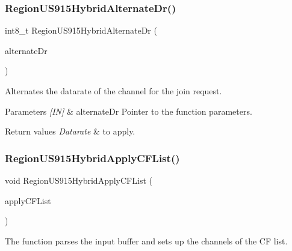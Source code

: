 \subsubsection{\texorpdfstring{Region\+U\+S915\+Hybrid\+Alternate\+Dr()}{RegionUS915HybridAlternateDr()}}
{\footnotesize\ttfamily int8\+\_\+t Region\+U\+S915\+Hybrid\+Alternate\+Dr (\begin{DoxyParamCaption}\item[{\hyperlink{group__REGION_ga001ea4338d1c83f4c785b49d7ad2d696}{Alternate\+Dr\+Params\+\_\+t} $\ast$}]{alternate\+Dr }\end{DoxyParamCaption})}



Alternates the datarate of the channel for the join request. 


\begin{DoxyParams}{Parameters}
{\em \mbox{[}\+I\+N\mbox{]}} & alternate\+Dr Pointer to the function parameters.\\
\hline
\end{DoxyParams}

\begin{DoxyRetVals}{Return values}
{\em Datarate} & to apply. \\
\hline
\end{DoxyRetVals}
\mbox{\label{group__REGIONUS915HYB_gadf2edbcb9c0e296e8de9fe4a40fc96ee}} 
\subsubsection{\texorpdfstring{Region\+U\+S915\+Hybrid\+Apply\+C\+F\+List()}{RegionUS915HybridApplyCFList()}}
{\footnotesize\ttfamily void Region\+U\+S915\+Hybrid\+Apply\+C\+F\+List (\begin{DoxyParamCaption}\item[{\hyperlink{group__REGION_ga71588e9ad07e34b78fa91d51881fd3c6}{Apply\+C\+F\+List\+Params\+\_\+t} $\ast$}]{apply\+C\+F\+List }\end{DoxyParamCaption})}



The function parses the input buffer and sets up the channels of the CF list. 


